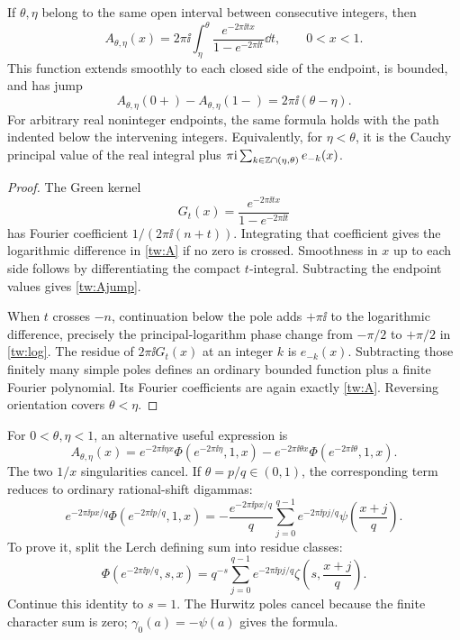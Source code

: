 \begin{lemma}
\label{tw:bounded}
If $\theta,\eta$ belong to the same open interval between consecutive
integers, then
\begin{equation}
 A_{\theta,\eta}(x)=2\pi\ii\int_\eta^\theta
       \frac{e^{-2\pi\ii t x}}{1-e^{-2\pi\ii t}}\dd t,
       \qquad 0<x<1.
 \label{tw:Aintegral}
\end{equation}
This function extends smoothly to each closed side of the endpoint,
is bounded, and has jump
\begin{equation}
 A_{\theta,\eta}(0+)-A_{\theta,\eta}(1-)
                    =2\pi\ii(\theta-\eta).
 \label{tw:Ajump}
\end{equation}
For arbitrary real noninteger endpoints, the same formula holds with
the path indented below the intervening integers. Equivalently, for
$\eta<\theta$, it is the Cauchy principal value of the real integral
plus $\pi\mathrm i\sum_{k\in\mathbb Z\cap(\eta,\theta)}e_{-k}(x)$.
\end{lemma}

\begin{proof}
The Green kernel
\begin{equation}
 G_t(x)=\frac{e^{-2\pi\ii t x}}{1-e^{-2\pi\ii t}}
 \label{tw:G}
\end{equation}
has Fourier coefficient $1/(2\pi\ii(n+t))$. Integrating that
coefficient gives the logarithmic difference in \eqref{tw:A} if
no zero is crossed. Smoothness in $x$ up to each side follows by
differentiating the compact $t$-integral. Subtracting the endpoint
values gives \eqref{tw:Ajump}.

When $t$ crosses $-n$, continuation below the pole adds $+\pi\ii$
to the logarithmic difference, precisely the principal-logarithm phase
change from $-\pi/2$ to $+\pi/2$ in \eqref{tw:log}.
The residue of $2\pi\ii G_t(x)$ at an integer $k$ is $e_{-k}(x)$.
Subtracting those finitely many simple poles defines an ordinary bounded
function plus a finite Fourier polynomial. Its Fourier coefficients
are again exactly \eqref{tw:A}. Reversing orientation covers
$\theta<\eta$.
\end{proof}

For $0<\theta,\eta<1$, an alternative useful expression is
\begin{equation}
 A_{\theta,\eta}(x)
 =e^{-2\pi\ii\eta x}\Phi(e^{-2\pi\ii\eta},1,x)
  -e^{-2\pi\ii\theta x}\Phi(e^{-2\pi\ii\theta},1,x).
 \label{tw:ALerch}
\end{equation}
The two $1/x$ singularities cancel. If $\theta=p/q\in(0,1)$,
the corresponding term reduces to ordinary rational-shift digammas:
\begin{equation}
 e^{-2\pi\ii px/q}\Phi(e^{-2\pi\ii p/q},1,x)
 =-\frac{e^{-2\pi\ii px/q}}q
      \sum_{j=0}^{q-1}e^{-2\pi\ii pj/q}
                          \psi\left(\frac{x+j}{q}\right).
 \label{tw:rational}
\end{equation}
To prove it, split the Lerch defining sum into residue classes:
\[
 \Phi(e^{-2\pi\ii p/q},s,x)
   =q^{-s}\sum_{j=0}^{q-1}e^{-2\pi\ii pj/q}
                          \zeta\left(s,\frac{x+j}{q}\right).
\]
Continue this identity to $s=1$. The Hurwitz poles cancel because the finite character sum is
zero; $\gamma_0(a)=-\psi(a)$ gives the formula.

